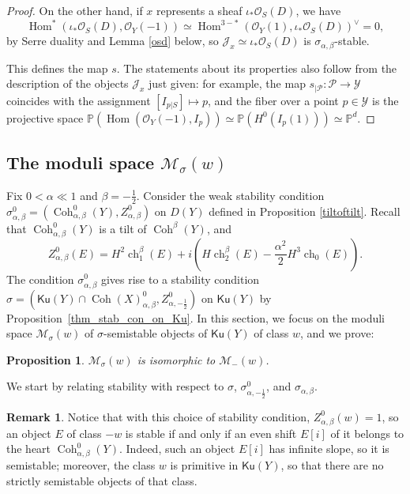 \documentclass[11pt]{amsart}
\newtheorem{proposition}[thm]{Proposition}
\theoremstyle{definition}
\newtheorem{remark}[thm]{Remark}
\newcommand{\pr}[1]{\mathbb P^{#1}}
\DeclareMathOperator{\Hom}{Hom}
\DeclareMathOperator{\Ch}{ch}
\DeclareMathOperator{\Coh}{Coh}
\newcommand{\sO}{\mathcal{O}}
\newcommand{\sM}{\mathcal{M}}
\newcommand{\Ku}{\mathsf{Ku}}
\begin{document}
\begin{proof}
On the other hand, if $x$ represents a sheaf $\iota_*\sO_S(D)$, we have 
\[ \Hom^*(\iota_*\sO_S(D),\sO_Y(-1)) \simeq \Hom^{3-*}(\sO_Y(1), \iota_*\sO_S(D))^\vee=0, \]
by Serre duality and Lemma \ref{osd} below, so $\mathcal J_x\simeq \iota_*\sO_S(D)$ is $\sigma_{\alpha,\beta}$-stable.

This defines the map $s$. The statements about its properties also follow from the description of the objects $\mathcal J_x$ just given: for example, the map $s_{|\mathcal P}\colon \mathcal P \to \mathcal Y$ coincides with the assignment $[I_{p|S}]\mapsto p$, and the fiber over a point $p\in \mathcal Y$ is the projective space $\mathbb P(\Hom(\sO_Y(-1),I_p))\simeq\mathbb P(H^0(I_p(1)))\simeq \pr d$.
\end{proof}

\subsection{The moduli space $\sM_\sigma(w)$}\label{sec_sigma_moduli}

Fix $0<\alpha\ll 1$ and $\beta=-\frac 12$. Consider the weak stability condition $\sigma^0_{\alpha,\beta}=(\Coh^0_{\alpha,\beta}(Y), Z_{\alpha, \beta}^0)$ on $D(Y)$ defined in Proposition \ref{tiltoftilt}. Recall  that $\Coh^0_{\alpha,\beta}(Y)$ is a tilt of $\Coh^\beta(Y)$, and 
\[
Z_{\alpha,\beta}^0(E) = H^2\Ch^{\beta}_1(E) +i \left(H\Ch_2^\beta(E) -\dfrac{\alpha^2}{2}H^3\Ch_0(E)\right).
\]
The condition $\sigma^0_{\alpha,\beta}$ gives rise to a stability condition $\sigma=(\Ku(Y) \cap \Coh(X)^{0}_{\alpha, \beta},Z^0_{\alpha,-\frac{1}{2}})$ on $\Ku(Y)$ by Proposition~\ref{thm_stab_con_on_Ku}. In this section, we focus on the moduli space $\mathcal{M}_\sigma(w)$ of $\sigma$-semistable objects of $\Ku(Y)$ of class $w$, and we prove:

\begin{proposition}\label{kuzistilt}
$\mathcal{M}_\sigma(w)$ is isomorphic to $\mathcal{M}_-(w)$.
\end{proposition}

We start by relating stability with respect to $\sigma$,  $\sigma^0_{\alpha,-\frac12}$, and $\sigma_{\alpha,\beta}$.

\begin{remark} \label{rmkstable} Notice that  with this choice of stability condition, $Z^0_{\alpha,\beta}(w)=1$, so  an object $E$ of class $-w$ is stable if and only if an even shift $E[i]$ of it belongs to the heart $\Coh^0_{\alpha,\beta}(Y)$. Indeed, such an object $E[i]$ has infinite slope, so it is semistable; moreover, the class $w$ is primitive in $\Ku(Y)$, so that there are no strictly semistable objects of that class.
\end{remark}
\end{document}
